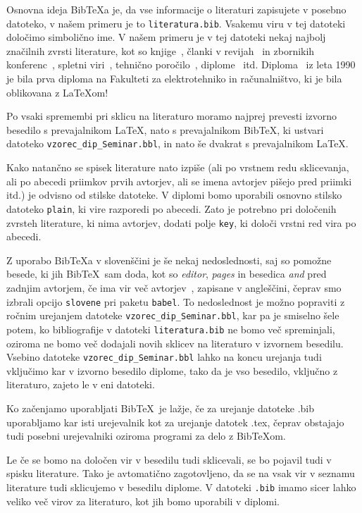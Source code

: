 \documentclass[a4paper, 12pt]{book}
\newcommand{\BibTeX}{{\sc Bib}\TeX}
\begin{document}
{{Osnovna ideja \BibTeX{a} je, da vse informacije o literaturi zapisujete v posebno datoteko, v našem primeru je to \texttt{literatura.bib}.
Vsakemu viru v tej datoteki določimo simbolično ime.
V  našem primeru je v tej datoteki nekaj najbolj značilnih zvrsti literature, kot so knjige~\cite{lamport}, 
članki v revijah~\cite{leonardo} in zbornikih konferenc~\cite{poglavje_springer}, 
spletni viri~\cite{bib,slovarcek,video}, 
tehnično poročilo~\cite{andersen2012kinect}, 
diplome~\cite{diploma} itd.
Diploma~\cite{diploma} iz leta 1990 je bila prva diploma na Fakulteti za elektrotehniko in računalništvo, ki je bila oblikovana z \LaTeX om!

Po vsaki spremembi pri sklicu na literaturo moramo najprej prevesti izvorno besedilo s prevajalnikom \LaTeX, nato s prevajalnikom  \BibTeX, ki ustvari datoteko  {\tt vzorec\_dip\_Seminar.bbl}, in nato še dvakrat s prevajalnikom  \LaTeX.

Kako natančno se spisek literature nato izpiše (ali po vrstnem redu sklicevanja, ali po abecedi priimkov prvih avtorjev, ali se imena avtorjev pišejo pred priimki itd.) je odvisno od stilske datoteke.
V diplomi bomo uporabili osnovno stilsko datoteko \texttt{plain}, ki vire razporedi po abecedi.
Zato je potrebno pri določenih zvrsteh literature, ki nima avtorjev, dodati polje \texttt{key}, ki določi vrstni red vira po abecedi.

Z uporabo \BibTeX{a} v slovenščini je še nekaj nedoslednosti, saj so pomožne besede, ki jih \BibTeX\ sam doda,  kot so \textit{editor},  \textit{pages} in besedica  \textit{and} pred zadnjim avtorjem, 
če ima vir več avtorjev~\cite{andersen2012kinect}, zapisane v angleščini,
čeprav smo izbrali opcijo \texttt{slovene} pri paketu \texttt{babel}.
To nedoslednost je možno popraviti z ročnim urejanjem datoteke {\tt vzorec\_dip\_Seminar.bbl}, 
kar pa je smiselno šele potem, ko bibliografije v datoteki \texttt{literatura.bib} ne bomo več spreminjali,
oziroma ne bomo več dodajali novih sklicev na literaturo v izvornem besedilu.
Vsebino datoteke {\tt vzorec\_dip\_Seminar.bbl} lahko na koncu urejanja tudi vključimo kar v izvorno besedilo diplome, tako da je vso besedilo, vključno z literaturo, zajeto le v eni datoteki.

Ko začenjamo uporabljati \BibTeX\ je lažje, če za urejanje datoteke .bib uporabljamo kar isti urejevalnik kot za urejanje datotek .tex, 
čeprav obstajajo tudi posebni urejevalniki oziroma programi za delo z \BibTeX om.

Le če se bomo na določen vir v besedilu tudi sklicevali, se bo pojavil tudi v spisku literature.
Tako je avtomatično zagotovljeno, da se na vsak vir v seznamu literature tudi sklicujemo v besedilu diplome.
V datoteki \texttt{.bib} imamo sicer lahko veliko več virov za literaturo, kot jih bomo uporabili v diplomi.

}}
\end{document}
